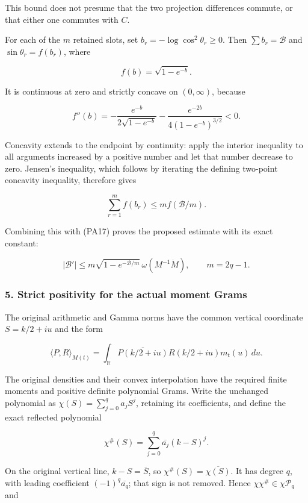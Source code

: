\documentclass{article}
\begin{document}
This bound does not presume that the two projection differences commute, or that either one commutes with \(C\).

For each of the \(m\) retained slots, set \(b_r=-\log\cos^2\theta_r\ge0\). Then \(\sum b_r=\mathcal B\) and \(\sin\theta_r=f(b_r)\), where

\[
f(b)=\sqrt{1-e^{-b}}.
\tag{PA18}
\]

It is continuous at zero and strictly concave on \((0,\infty)\), because

\[
f''(b)=-\frac{e^{-b}}{2\sqrt{1-e^{-b}}}
        -\frac{e^{-2b}}{4(1-e^{-b})^{3/2}}<0.
\]

Concavity extends to the endpoint by continuity: apply the interior inequality to all arguments increased by a positive number and let that number decrease to zero. Jensen's inequality, which follows by iterating the defining two-point concavity inequality, therefore gives

\[
\sum_{r=1}^m f(b_r)\le m f(\mathcal B/m).
\]

Combining this with (PA17) proves the proposed estimate with its exact constant:

\[
\boxed{
|\mathcal B'|
\le m\sqrt{1-e^{-\mathcal B/m}}\,\omega(M^{-1}\dot M),
\qquad m=2q-1.
}
\tag{PA19}
\]

\subsubsection{5. Strict positivity for the actual moment Grams}\label{endpoint-principal_angle_volume_review--strict-positivity-for-the-actual-moment-grams}

The original arithmetic and Gamma norms have the common vertical coordinate \(S=k/2+iu\) and the form

\[
\langle P,R\rangle_{M(t)}
=\int_{\mathbb R}\overline{P(k/2+iu)}R(k/2+iu)m_t(u)\,du.
\tag{PA20}
\]

The original densities and their convex interpolation have the required finite moments and positive definite polynomial Grams. Write the unchanged polynomial as \(\chi(S)=\sum_{j=0}^q a_jS^j\), retaining its coefficients, and define the exact reflected polynomial

\[
\chi^\#(S)=\sum_{j=0}^q\overline{a_j}(k-S)^j.
\tag{PA21}
\]

On the original vertical line, \(k-S=\overline S\), so \(\chi^\#(S)=\overline{\chi(S)}\). It has degree \(q\), with leading coefficient \((-1)^q\overline{a_q}\); that sign is not removed. Hence \(\chi\chi^\#\in\chi\mathcal P_q\) and
\end{document}
